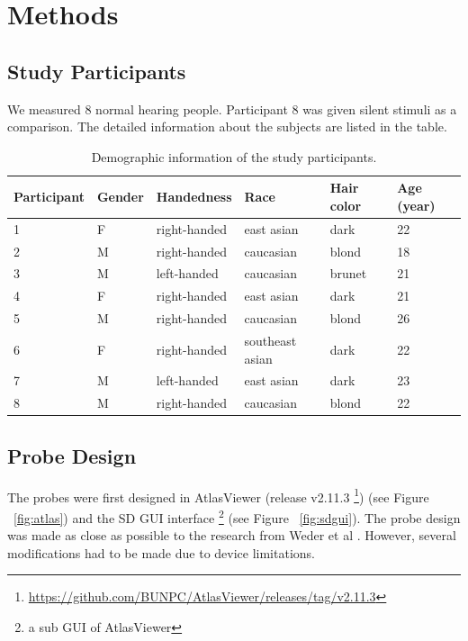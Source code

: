 \chapter{Methods}
\section {Study Participants}
We measured 8 normal hearing people. Participant 8 was given silent stimuli as a comparison. The detailed information about the subjects are listed in the table.

\begin{table}[h!]
  \begin{center}
    
    
    \begin{tabular}{p{2.3cm} | p{1.5cm} |p{2.5cm} | p{2.8cm} | p{2.1cm} | p{2.2cm}} %
      \textbf{Participant} & \textbf {Gender}& \textbf{Handedness} & \textbf{Race} & \textbf{Hair color} &\textbf {Age (year)}\\ 
      \hline
      1 & F & right-handed & east asian & dark & 22\\
      2 & M & right-handed  & caucasian & blond & 18 \\
      3 & M & left-handed &  caucasian & brunet & 21\\
      4 & F  & right-handed & east asian & dark& 21 \\
      5 & M & right-handed  &  caucasian& blond & 26 \\
      6 &  F & right-handed & southeast asian & dark & 22 \\
      7 &  M & left-handed &  east asian & dark & 23 \\
      8 & M & right-handed  & caucasian & blond & 22 \\
    \end{tabular}
    \label{tab:table1}
    \caption{Demographic information of the study participants.}
  \end{center}
  
\end{table}

\section {Probe Design}
The probes were first designed in AtlasViewer (release v2.11.3 \footnote{\url{https://github.com/BUNPC/AtlasViewer/releases/tag/v2.11.3}})  (see Figure ~\ref{fig:atlas}) \citep {10.1117/1.NPh.2.2.020801} and the SD GUI interface \footnote{a sub GUI of AtlasViewer} (see Figure ~\ref{fig:sdgui}). The probe design was made as close as possible to the research from Weder et al \citeyearpar{Weder2018}. However, several modifications had to be made due to device limitations.

